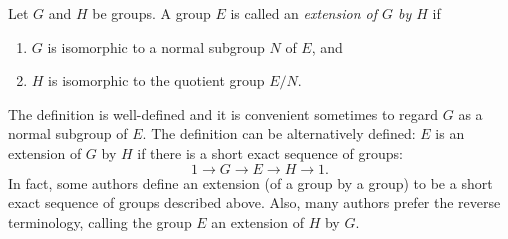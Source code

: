 \documentclass[12pt]{article}
\begin{document}

Let $G$ and $H$ be groups.  A group $E$ is called an \emph{extension
of $G$ by $H$} if
\begin{enumerate}
\item $G$ is isomorphic to a normal subgroup $N$ of $E$, and
\item $H$ is isomorphic to the quotient group $E/N$.
\end{enumerate}
The definition is well-defined and it is convenient sometimes to
regard $G$ as a normal subgroup of $E$.  The definition can be
alternatively defined: $E$ is an extension of $G$ by $H$ if there is
a short exact sequence of groups:
$$1\longrightarrow G\longrightarrow E\longrightarrow H\longrightarrow 1.$$
In fact, some authors define an extension (of a group by a group) to
be a short exact sequence of groups described above.  Also, many authors
prefer the reverse terminology, calling the group $E$ an extension of $H$
by $G$.
\end{document}
